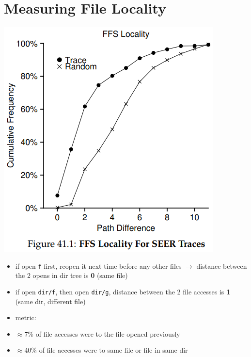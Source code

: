 \section*{Measuring File Locality}
\begin{minipage}{.5\linewidth}
  \includegraphics[width=\linewidth]{imgs/ffs_locality}
\end{minipage}
\begin{minipage}{.5\linewidth}
\begin{itemize}
\item if open \texttt{f} first, reopen it next time before any other files $\to$ distance between the 2 opens in dir tree is \textbf{0} (same file)
\item if open \texttt{dir/f}, then open \texttt{dir/g}, distance between the 2 file accesses is \textbf{1} (same dir, different file)
\item metric:
\item $\approx$7\% of file accesses were to the file opened previously
\item $\approx$40\% of file accesses were to same file or file in same dir
\end{itemize}
\end{minipage}
